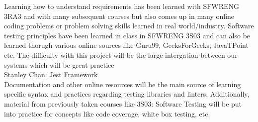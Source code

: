 \documentclass[12pt, titlepage]{article}
\begin{document}
\begin{outline}[enumerate]
    Learning how to understand requirements has been learned with SFWRENG 3RA3 and with many subsequent courses but also comes up in many online coding problems or problem solving skills learned in real world/industry. Software testing principles have been learned in class in SFWRENG 3S03 and can also be learned thorugh various online sources like Guru99, GeeksForGeeks, JavaTPoint etc. The difficulty with this project will be the large intergation between our systems which will be great practice\\
    \2 Stanley Chan: Jest Framework\\
    Documentation and other online resources will be the main source of learning specific syntax and practices regarding testing libraries and linters. Additionally, material from previously taken courses like 3S03: Software Testing will be put into practice for concepts like code coverage, white box testing, etc.\\
\end{outline}
\end{document}

